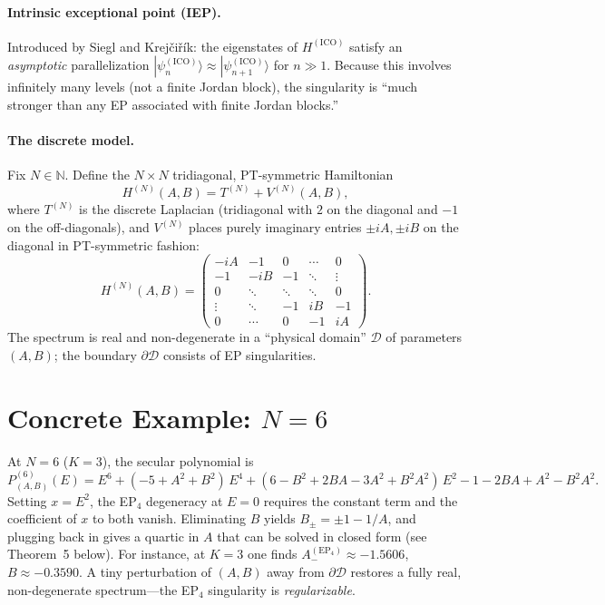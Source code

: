 \documentclass[11pt,a4paper]{article}
\begin{document}
\paragraph{Intrinsic exceptional point (IEP).}
Introduced by Siegl and Krej\v{c}i\v{r}\'ik: the eigenstates of $H^{(\mathrm{ICO})}$ satisfy an \emph{asymptotic} parallelization $|\psi_n^{(\mathrm{ICO})}\rangle \approx |\psi_{n+1}^{(\mathrm{ICO})}\rangle$ for $n \gg 1$.  Because this involves infinitely many levels (not a finite Jordan block), the singularity is ``much stronger than any EP associated with finite Jordan blocks.''

\paragraph{The discrete model.}
Fix $N \in \mathbb{N}$.  Define the $N \times N$ tridiagonal, PT-symmetric Hamiltonian
\[
  H^{(N)}(A,B) = T^{(N)} + V^{(N)}(A,B),
\]
where $T^{(N)}$ is the discrete Laplacian (tridiagonal with $2$ on the diagonal and $-1$ on the off-diagonals), and $V^{(N)}$ places purely imaginary entries $\pm iA, \pm iB$ on the diagonal in PT-symmetric fashion:
\[
  H^{(N)}(A,B) =
  \begin{pmatrix}
    -iA & -1 & 0 & \cdots & 0 \\
    -1 & -iB & -1 & \ddots & \vdots \\
    0 & \ddots & \ddots & \ddots & 0 \\
    \vdots & \ddots & -1 & iB & -1 \\
    0 & \cdots & 0 & -1 & iA
  \end{pmatrix}.
\]
The spectrum is real and non-degenerate in a ``physical domain'' $\mathcal{D}$ of parameters $(A,B)$; the boundary $\partial\mathcal{D}$ consists of EP singularities.

\section{Concrete Example: $N=6$}

At $N=6$ ($K=3$), the secular polynomial is
\[
  P^{(6)}_{(A,B)}(E) = E^6 + (-5+A^2+B^2)\,E^4 + (6 - B^2 + 2BA - 3A^2 + B^2A^2)\,E^2
    - 1 - 2BA + A^2 - B^2A^2.
\]
Setting $x = E^2$, the EP$_4$ degeneracy at $E=0$ requires the constant term and the coefficient of $x$ to both vanish.  Eliminating $B$ yields $B_{\pm} = \pm 1 - 1/A$, and plugging back in gives a quartic in $A$ that can be solved in closed form (see Theorem~5 below).  For instance, at $K=3$ one finds $A^{(\mathrm{EP}_4)}_- \approx -1.5606$, $B \approx -0.3590$.  A tiny perturbation of $(A,B)$ away from $\partial\mathcal{D}$ restores a fully real, non-degenerate spectrum---the EP$_4$ singularity is \emph{regularizable}.
\end{document}
